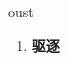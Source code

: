 
\begin{frame}
{\huge oust}
\begin{center}
\begin{enumerate}\Large
  \item \textbf{驱逐}
\end{enumerate}
\end{center}
\end{frame}
